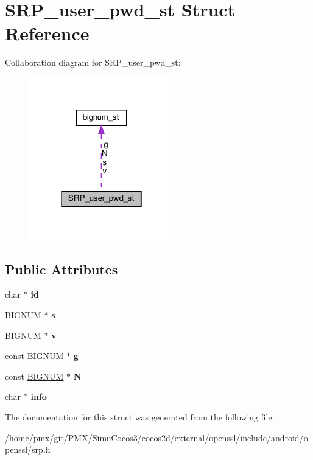 \hypertarget{structSRP__user__pwd__st}{}\section{S\+R\+P\+\_\+user\+\_\+pwd\+\_\+st Struct Reference}
\label{structSRP__user__pwd__st}


Collaboration diagram for S\+R\+P\+\_\+user\+\_\+pwd\+\_\+st\+:
\nopagebreak
\begin{figure}[H]
\begin{center}
\leavevmode
\includegraphics[width=178pt]{structSRP__user__pwd__st__coll__graph}
\end{center}
\end{figure}
\subsection*{Public Attributes}
\begin{DoxyCompactItemize}
\item 
\mbox{\label{structSRP__user__pwd__st_a4622de1d3074db36c3e328cd0be2ccf3}} 
char $\ast$ {\bfseries id}
\item 
\mbox{\label{structSRP__user__pwd__st_a9c8d8c8131dbf6ee5df02be2b6a6cac3}} 
\hyperlink{structbignum__st}{B\+I\+G\+N\+UM} $\ast$ {\bfseries s}
\item 
\mbox{\label{structSRP__user__pwd__st_a90985a4a0d41affbb74388070c3f67d7}} 
\hyperlink{structbignum__st}{B\+I\+G\+N\+UM} $\ast$ {\bfseries v}
\item 
\mbox{\label{structSRP__user__pwd__st_a26f763e9f841453c40834096adc81e8b}} 
const \hyperlink{structbignum__st}{B\+I\+G\+N\+UM} $\ast$ {\bfseries g}
\item 
\mbox{\label{structSRP__user__pwd__st_aac4b04555aad8f7d4bb33cc6bb9a2437}} 
const \hyperlink{structbignum__st}{B\+I\+G\+N\+UM} $\ast$ {\bfseries N}
\item 
\mbox{\label{structSRP__user__pwd__st_ad8ef83dd5384009efba20139c8237807}} 
char $\ast$ {\bfseries info}
\end{DoxyCompactItemize}


The documentation for this struct was generated from the following file\+:\begin{DoxyCompactItemize}
\item 
/home/pmx/git/\+P\+M\+X/\+Simu\+Cocos3/cocos2d/external/openssl/include/android/openssl/srp.\+h\end{DoxyCompactItemize}
